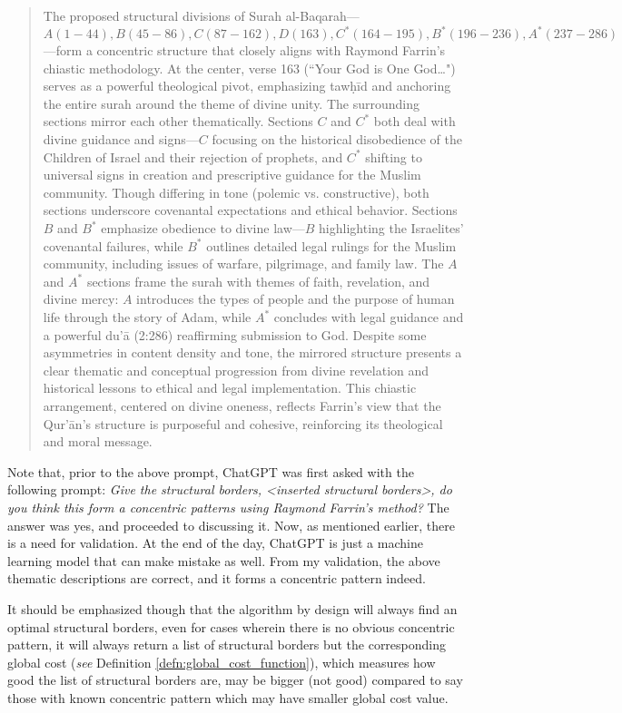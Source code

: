 \begin{quotation}
    The proposed structural divisions of Surah al-Baqarah—$A (1-44), B (45-86), C (87-162), D (163), C^* (164-195), B^* (196-236), A^* (237-286)$—form a concentric structure that closely aligns with Raymond Farrin's chiastic methodology. At the center, verse 163 (``Your God is One God…") serves as a powerful theological pivot, emphasizing tawḥīd and anchoring the entire surah around the theme of divine unity. The surrounding sections mirror each other thematically. Sections $C$ and $C^*$ both deal with divine guidance and signs—$C$ focusing on the historical disobedience of the Children of Israel and their rejection of prophets, and $C^*$ shifting to universal signs in creation and prescriptive guidance for the Muslim community. Though differing in tone (polemic vs. constructive), both sections underscore covenantal expectations and ethical behavior. Sections $B$ and $B^*$ emphasize obedience to divine law—$B$ highlighting the Israelites' covenantal failures, while $B^*$ outlines detailed legal rulings for the Muslim community, including issues of warfare, pilgrimage, and family law. The $A$ and $A^*$ sections frame the surah with themes of faith, revelation, and divine mercy: $A$ introduces the types of people and the purpose of human life through the story of Adam, while $A^*$ concludes with legal guidance and a powerful du'ā (2:286) reaffirming submission to God. Despite some asymmetries in content density and tone, the mirrored structure presents a clear thematic and conceptual progression from divine revelation and historical lessons to ethical and legal implementation. This chiastic arrangement, centered on divine oneness, reflects Farrin's view that the Qur'\=an's structure is purposeful and cohesive, reinforcing its theological and moral message.
\end{quotation}

Note that, prior to the above prompt, ChatGPT was first asked with the following prompt: \textit{Give the structural borders, <inserted structural borders>, do you think this form a concentric patterns using Raymond Farrin's method?} The answer was yes, and proceeded to discussing it. Now, as mentioned earlier, there is a need for validation. At the end of the day, ChatGPT is just a machine learning model that can make mistake as well. From my validation, the above thematic descriptions are correct, and it forms a concentric pattern indeed.

It should be emphasized though that the algorithm by design will always find an optimal structural borders, even for cases wherein there is no obvious concentric pattern, it will always return a list of structural borders but the corresponding global cost (\textit{see} Definition \ref{defn:global_cost_function}), which measures how good the list of structural borders are, may be bigger (not good) compared to say those with known concentric pattern which may have smaller global cost value.

